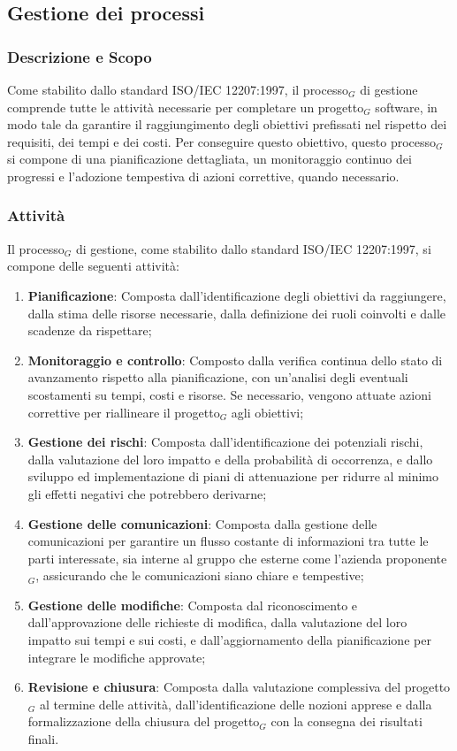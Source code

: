 \documentclass[10pt]{article}
\begin{document}
\begin{justify}
    \subsection{Gestione dei processi}

    \subsubsection{Descrizione e Scopo}
    Come stabilito dallo standard ISO/IEC 12207:1997, il processo$_G$ di gestione comprende tutte le attività necessarie per completare un progetto$_G$ software, in modo tale da garantire il raggiungimento degli obiettivi prefissati nel rispetto dei requisiti, dei tempi e dei costi. Per conseguire questo obiettivo, questo processo$_G$ si compone di una pianificazione dettagliata, un monitoraggio continuo dei progressi e l'adozione tempestiva di azioni correttive, quando necessario.

    \subsubsection{Attività}
    Il processo$_G$ di gestione, come stabilito dallo standard ISO/IEC 12207:1997, si compone delle seguenti attività:
    \begin{enumerate}
        \item \textbf{Pianificazione}: Composta dall'identificazione degli obiettivi da raggiungere, dalla stima delle risorse necessarie, dalla definizione dei ruoli coinvolti e dalle scadenze da rispettare;
        \item \textbf{Monitoraggio e controllo}: Composto dalla verifica continua dello stato di avanzamento rispetto alla pianificazione, con un'analisi degli eventuali scostamenti su tempi, costi e risorse. Se necessario, vengono attuate azioni correttive per riallineare il progetto$_G$ agli obiettivi;
        \item \textbf{Gestione dei rischi}: Composta dall'identificazione dei potenziali rischi, dalla valutazione del loro impatto e della probabilità di occorrenza, e dallo sviluppo ed implementazione di piani di attenuazione per ridurre al minimo gli effetti negativi che potrebbero derivarne;
        \item \textbf{Gestione delle comunicazioni}: Composta dalla gestione delle comunicazioni per garantire un flusso costante di informazioni tra tutte le parti interessate, sia interne al gruppo che esterne come l'azienda proponente$_G$, assicurando che le comunicazioni siano chiare e tempestive;
        \item \textbf{Gestione delle modifiche}: Composta dal riconoscimento e dall'approvazione delle richieste di modifica, dalla valutazione del loro impatto sui tempi e sui costi, e dall'aggiornamento della pianificazione per integrare le modifiche approvate;
        \item \textbf{Revisione e chiusura}: Composta dalla valutazione complessiva del progetto$_G$ al termine delle attività, dall'identificazione delle nozioni apprese e dalla formalizzazione della chiusura del progetto$_G$ con la consegna dei risultati finali.
    \end{enumerate}


\end{justify}
\end{document}
